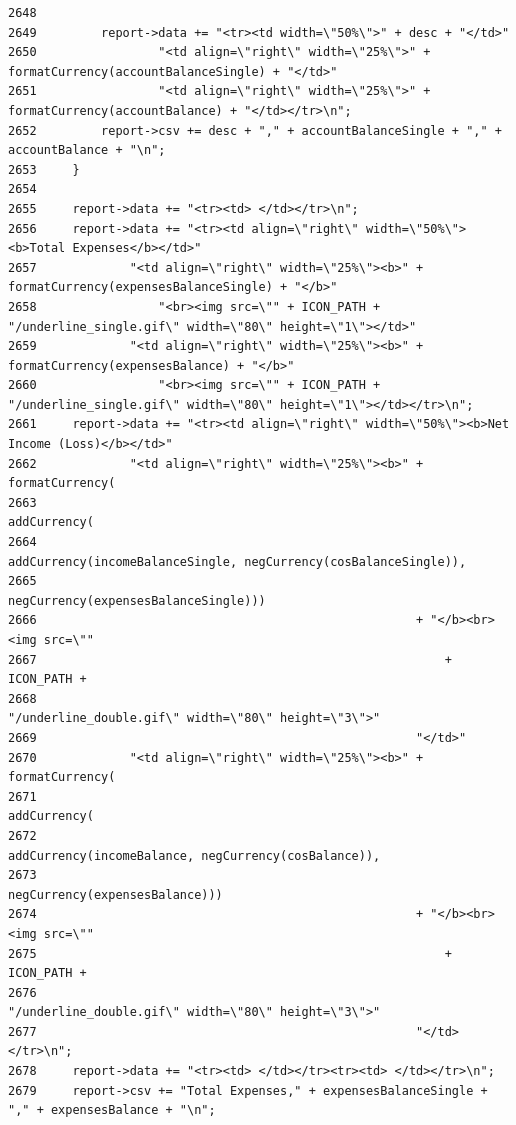 \begin{verbatim}
2648 
2649         report->data += "<tr><td width=\"50%\">" + desc + "</td>"
2650                 "<td align=\"right\" width=\"25%\">" + formatCurrency(accountBalanceSingle) + "</td>"
2651                 "<td align=\"right\" width=\"25%\">" + formatCurrency(accountBalance) + "</td></tr>\n";
2652         report->csv += desc + "," + accountBalanceSingle + "," + accountBalance + "\n";
2653     }
2654 
2655     report->data += "<tr><td> </td></tr>\n";
2656     report->data += "<tr><td align=\"right\" width=\"50%\"><b>Total Expenses</b></td>"
2657             "<td align=\"right\" width=\"25%\"><b>" + formatCurrency(expensesBalanceSingle) + "</b>"
2658                 "<br><img src=\"" + ICON_PATH + "/underline_single.gif\" width=\"80\" height=\"1\"></td>"
2659             "<td align=\"right\" width=\"25%\"><b>" + formatCurrency(expensesBalance) + "</b>"
2660                 "<br><img src=\"" + ICON_PATH + "/underline_single.gif\" width=\"80\" height=\"1\"></td></tr>\n";
2661     report->data += "<tr><td align=\"right\" width=\"50%\"><b>Net Income (Loss)</b></td>"
2662             "<td align=\"right\" width=\"25%\"><b>" + formatCurrency(
2663                                                       addCurrency(
2664                                                           addCurrency(incomeBalanceSingle, negCurrency(cosBalanceSingle)),
2665                                                           negCurrency(expensesBalanceSingle)))
2666                                                     + "</b><br><img src=\""
2667                                                         + ICON_PATH +
2668                                                         "/underline_double.gif\" width=\"80\" height=\"3\">"
2669                                                     "</td>"
2670             "<td align=\"right\" width=\"25%\"><b>" + formatCurrency(
2671                                                       addCurrency(
2672                                                           addCurrency(incomeBalance, negCurrency(cosBalance)),
2673                                                           negCurrency(expensesBalance)))
2674                                                     + "</b><br><img src=\""
2675                                                         + ICON_PATH +
2676                                                         "/underline_double.gif\" width=\"80\" height=\"3\">"
2677                                                     "</td></tr>\n";
2678     report->data += "<tr><td> </td></tr><tr><td> </td></tr>\n";
2679     report->csv += "Total Expenses," + expensesBalanceSingle + "," + expensesBalance + "\n";

\end{verbatim}
